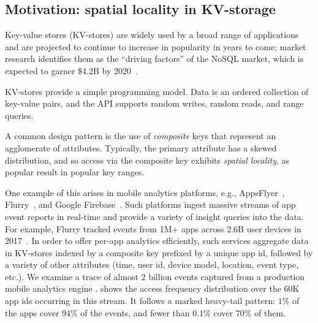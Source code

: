 \subsection{Motivation:  spatial locality in KV-storage}

Key-value stores (KV-stores) are widely used  by a broad range of applications and are projected
to continue to increase in popularity in years to come; market research  identifies them as the 
``driving factors'' of the NoSQL market, which is expected to garner \$4.2B by 2020~\cite{alliedmarketresearch}.

KV-stores provide a simple programming model. 
Data is an ordered collection of key-value pairs, and the API supports random writes, 
random reads, and range queries. 

A common design pattern is the use of \emph{composite} keys that represent an agglomerate of attributes.
Typically, the primary attribute %
has a skewed distribution, and so   access via the composite key exhibits \emph{spatial locality}, as 
popular  result in popular key ranges. 

One example of this arises in mobile analytics platforms, e.g., AppsFlyer~\cite{appsflyer}, Flurry~\cite{flurry}, 
and Google Firebase~\cite{firebase}. %
Such platforms %
ingest massive streams of app event reports %
in  real-time and provide a variety of insight queries into the data. For example, Flurry tracked events from  
1M+ apps across 2.6B user devices  in 2017~\cite{FlurryReport2017}. In order to offer per-app analytics efficiently,
such services aggregate data in KV-stores indexed by a composite key prefixed by a unique app 
id,  followed by a variety of other attributes (time, user id, device model, location, event type, etc.).
%
We examine a trace of almost $2$ billion events captured from a production mobile analytics engine 
.  
 shows the access frequency distribution over the  $60$K app ids occurring in this stream. It follows a marked
heavy-tail pattern: 
$1$\% of the apps  cover $94$\% of the events, and fewer 
than $0.1$\% cover $70$\% of them. 


